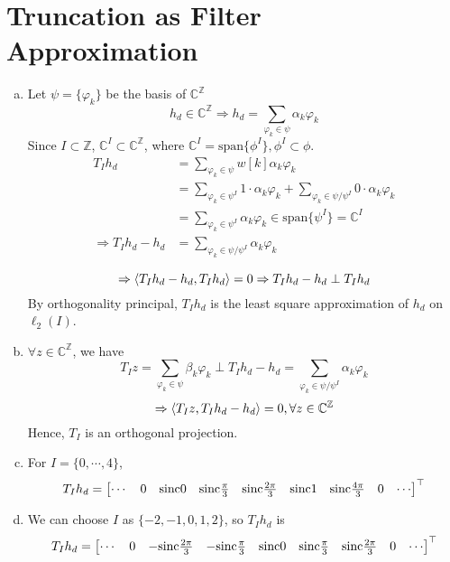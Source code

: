 \section{Truncation as Filter Approximation}\label{sec:p1}

\begin{enumerate}[(a)]
\item Let $\psi = \{\varphi_k\}$ be the basis of $\mathbb{C}^\mathbb{Z}$
\[h_d \in \mathbb{C}^\mathbb{Z} \Rightarrow h_d = \sum_{\varphi_k \in \psi} \alpha_k \varphi_k\]
Since $I \subset \mathbb{Z}$, $\mathbb{C}^I \subset \mathbb{C}^\mathbb{Z}$, where $\mathbb{C}^I = \mathrm{span}\{\phi^I\}, \phi^I \subset \phi$.
\begin{align*}
	T_I h_d
	&= \sum_{\varphi_k \in \psi}w[k]\alpha_k\varphi_k \\
	&= \sum_{\varphi_k \in \psi^I}1\cdot\alpha_k\varphi_k + \sum_{\varphi_k \in \psi/\psi^I}0\cdot\alpha_k\varphi_k\\
	&= \sum_{\varphi_k \in \psi^I}\alpha_k\varphi_k \in \mathrm{span}\{\psi^I\} = \mathbb{C}^I \\
	\Rightarrow T_I h_d - h_d
	&= \sum_{\varphi_k \in \psi/\psi^I} \alpha_k\varphi_k \\
\end{align*}
\[\Rightarrow \left\langle T_I h_d - h_d, T_Ih_d \right\rangle = 0 \Rightarrow T_I h_d - h_d \perp T_Ih_d\]
By orthogonality principal, $T_I h_d$ is the least square approximation of $h_d$ on $\ell_2(I)$.

\item $\forall z \in \mathbb{C}^\mathbb{Z}$, we have
\[T_I z = \sum_{\varphi_k \in \psi} \beta_k\varphi_k \perp T_Ih_d - h_d = \sum_{\varphi_k \in \psi/\psi^I} \alpha_k\varphi_k\]
\[\Rightarrow \left\langle T_I z, T_Ih_d - h_d \right\rangle = 0, \forall z \in \mathbb{C}^\mathbb{Z}\]
Hence, $T_I$ is an orthogonal projection.

\item For $I = \{0, \cdots, 4\}$,
\[T_Ih_d = \begin{bmatrix} \cdots & 0 & \mathrm{sinc} 0 & \mathrm{sinc} \frac{\pi}{3} & \mathrm{sinc} \frac{2\pi}{3} & \mathrm{sinc} 1 & \mathrm{sinc} \frac{4\pi}{3} & 0 & \cdots  \end{bmatrix}^\top\]

\item We can choose $I$ as $\{-2,-1,0,1,2\}$, so $T_Ih_d$ is
\[T_Ih_d = \begin{bmatrix} \cdots & 0 & -\mathrm{sinc} \frac{2\pi}{3} & -\mathrm{sinc} \frac{\pi}{3} & \mathrm{sinc} 0 & \mathrm{sinc} \frac{\pi}{3} & \mathrm{sinc} \frac{2\pi}{3} & 0 & \cdots \end{bmatrix}^\top\]

\end{enumerate}